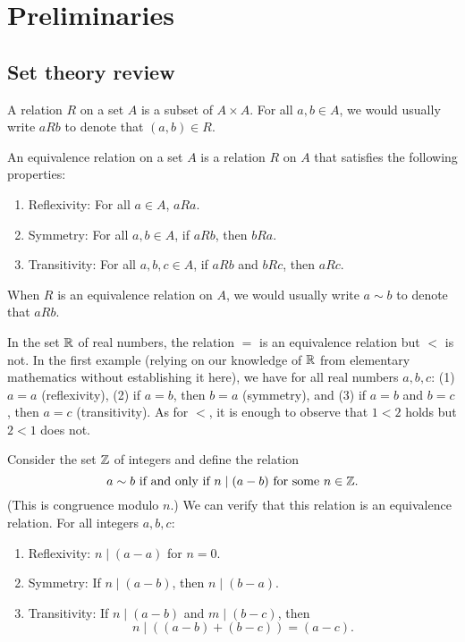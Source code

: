 \chapter{Preliminaries}

\section{Set theory review}

\begin{definition}[Relation]
    A relation \(R\) on a set \(A\) is a subset of \(A \times A\). For all \(a,
    b \in A\), we would usually write \(a R b\) to denote that \((a, b) \in R\).
\end{definition}

\begin{definition}
    An equivalence relation on a set \(A\) is a relation \(R\) on \(A\) that
    satisfies the following properties:
    \begin{enumerate}[label=(\alph*)]
        \item Reflexivity: For all \(a \in A\), \(a R a\).
        \item Symmetry: For all \(a, b \in A\), if \(a R b\), then \(b R a\).
        \item Transitivity: For all \(a, b, c \in A\), if \(a R b\) and \(b R
        c\), then \(a R c\).
    \end{enumerate}

    When \(R\) is an equivalence relation on \(A\), we would usually write \(a
    \sim b\) to denote that \(a R b\).
\end{definition}

\begin{example}
    In the set \(\mathbb{R}\) of real numbers, the relation \(=\) is an equivalence
    relation but \(<\) is not. In the first example (relying on our knowledge of
    \(\mathbb{R}\) from elementary mathematics without establishing it here), we have
    for all real numbers \(a, b, c\): (1) \(a = a\) (reflexivity), (2) if \(a =
    b\), then \(b = a\) (symmetry), and (3) if \(a = b\) and \(b = c\), then \(a
    = c\) (transitivity). As for \(<\), it is enough to observe that \(1 < 2\)
    holds but \(2 < 1\) does not.
\end{example}

\begin{example}
    Consider the set \(\mathbb{Z}\) of integers and define the relation
    \[
        a \sim b \text{ if and only if } n \mid (a - b) \text{ for some } n \in \mathbb{Z}.
    \]
    (This is congruence modulo \(n\).) We can verify that this relation is an
    equivalence relation. For all integers \(a, b, c\):
    \begin{enumerate}[label=(\alph*), itemsep=0pt, wide]
        \item Reflexivity: \(n \mid (a - a)\) for \(n = 0\).
        \item Symmetry: If \(n \mid (a - b)\), then \(n \mid (b - a)\).
        \item Transitivity: If \(n \mid (a - b)\) and \(m \mid (b - c)\), then
        \[n \mid ((a - b) + (b - c)) = (a - c).\]
    \end{enumerate}
\end{example}

